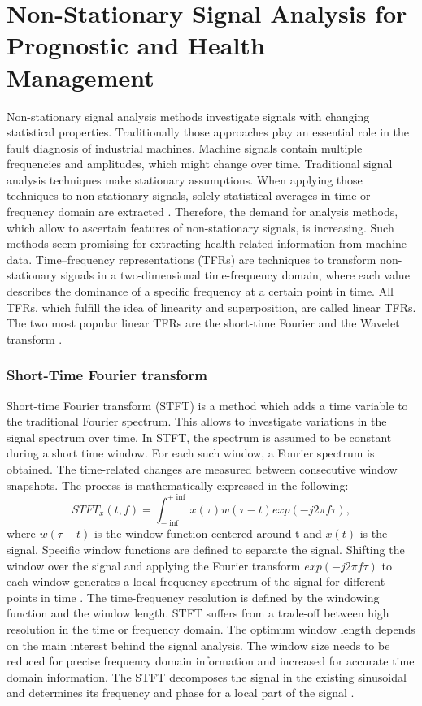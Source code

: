 \section{Non-Stationary Signal Analysis for Prognostic and Health Management}
Non-stationary signal analysis methods investigate signals with changing statistical properties. Traditionally those approaches play an essential role in the fault diagnosis of industrial machines. Machine signals contain multiple frequencies and amplitudes, which might change over time. Traditional signal analysis techniques make stationary assumptions. When applying those techniques to non-stationary signals, solely statistical averages in time or frequency domain are extracted \cite{FENG2013}. Therefore, the demand for analysis methods, which allow to ascertain features of non-stationary signals, is increasing. Such methods seem promising for extracting health-related information from machine data. Time–frequency representations (TFRs) are techniques to transform non-stationary signals in a two-dimensional time-frequency domain, where each value describes the dominance of a specific frequency at a certain point in time. All TFRs, which fulfill the idea of linearity and superposition, are called linear TFRs. The two most popular linear TFRs are the short-time Fourier and the Wavelet transform \cite{Hlawatsch1992}. 


\subsubsection{Short-Time Fourier transform}
Short-time Fourier transform (STFT) is a method which adds a time variable to the traditional Fourier spectrum. This allows to investigate variations in the signal spectrum over time. In STFT, the spectrum is assumed to be constant during a short time window. For each such window, a Fourier spectrum is obtained. The time-related changes are measured between consecutive window snapshots. The process is mathematically expressed in the following:  
\begin{equation}
    STFT_{x}(t,f) = \int_{- \inf}^{+ \inf}x(\tau) w(\tau -t) exp(-j2\pi f \tau),
\end{equation}
where  $w(\tau -t)$ is the window function centered around t and $x(t)$ is the signal. Specific window functions are defined to separate the signal. Shifting the window over the signal and applying the Fourier transform $exp(-j2\pi f \tau)$ to each window generates a local frequency spectrum of the signal for different points in time \cite{FENG2013}. The time-frequency resolution is defined by the windowing function and the window length. STFT suffers from a trade-off between high resolution in the time or frequency domain. The optimum window length depends on the main interest behind the signal analysis. The window size needs to be reduced for precise frequency domain information and increased for accurate time domain information. The STFT decomposes the signal in the existing sinusoidal and determines its frequency and phase for a local part of the signal \cite{Hlawatsch1992}. 

